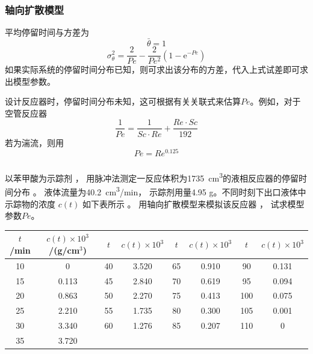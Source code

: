 \begin{frame}
    \frametitle{轴向扩散模型}

    平均停留时间与方差为
    \[
        \bar \theta = 1
    \]
    \[
        \sigma_{\theta}^{2}=\frac{2}{P e}-\frac{2}{P e^{2}}(1-\mathrm{e}^{-P e})
    \]
    如果实际系统的停留时间分布已知，则可求出该分布的方差，代入上式试差即可求出模型参数。

    设计反应器时，停留时间分布未知，这可根据有关关联式来估算$Pe$。例如，对于空管反应器
    \[
        \frac{1}{Pe} = \frac{1}{Sc \cdot Re} + \frac{Re \cdot Sc}{192}
    \]
    若为湍流，则用
    \[
        Pe = Re^{0.125}
    \]

\end{frame}


\begin{frame}[t]
    \frametitle{}
    \begin{example}
        以苯甲酸为示踪剂 ， 用脉冲法测定一反应体积为\SI{1735}{cm^3}的液相反应器的停留时间分布 。 液体流量为\SI{40.2}{cm^3/min}， 示踪剂用量4.95 g。不同时刻下出口液体中示踪物的浓度 $c(t)$ 如下表所示 。 用轴向扩散模型来模拟该反应器 ， 试求模型参数$Pe$。
        \begin{table}
            \centering
            \begin{tabular}{cc|cc|cc|cc}
                \bottomrule
                $t$/min & $c(t)\times 10^3$/(g/cm$^3$) & $t$ & $c(t)\times 10^3$ & $t$ & $c(t)\times 10^3$ & $t$ & $c(t)\times 10^3$   \\ \hline
                10 & 0     & 40 & 3.520 & 65 & 0.910 & 90 & 0.131  \\ 
                15 & 0.113 & 45 & 2.840 & 70 & 0.619 & 95 & 0.094  \\ 
                20 & 0.863 & 50 & 2.270 & 75 & 0.413 & 100 & 0.075  \\ 
                25 & 2.210 & 55 & 1.735 & 80 & 0.300 & 105 & 0.001  \\ 
                30 & 3.340 & 60 & 1.276 & 85 & 0.207 & 110 & 0  \\ 
                35 & 3.720 &  &  &  &  &  &  \\ \toprule
            \end{tabular}
        \end{table}
        \vspace{-5pt}
    \end{example}
\end{frame}


